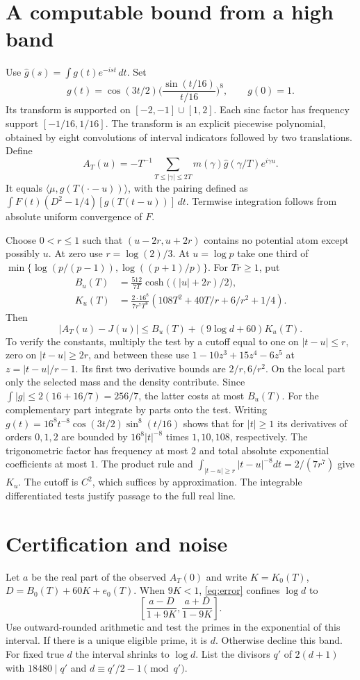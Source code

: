 \documentclass[11pt]{article}
\begin{document}
\section{A computable bound from a high band}
Use $\widehat g(s)=\int g(t)e^{-ist}\,dt$. Set
\[
 g(t)=\cos(3t/2)\bigg(\frac{\sin(t/16)}{t/16}\bigg)^8,\qquad g(0)=1.
\]
Its transform is supported on $[-2,-1]\cup[1,2]$. Each sinc factor
has frequency support $[-1/16,1/16]$. The transform is an explicit
piecewise polynomial, obtained by eight convolutions of interval
indicators followed by two translations. Define
\[
 A_T(u)=-T^{-1}\sum_{T\le|\gamma|\le2T}m(\gamma)
                \widehat g(\gamma/T)e^{i\gamma u}.
\]
It equals $\langle\mu,g(T(\cdot-u))\rangle$, with the pairing defined as
$\int F(t)(D^2-1/4)[g(T(t-u))]\,dt$.
Termwise integration follows from absolute uniform convergence of $F$.

Choose $0<r\le1$ such that $(u-2r,u+2r)$ contains no potential atom except
possibly $u$. At zero use $r=\log(2)/3$. At $u=\log p$ take one third
of $\min\{\log(p/(p-1)),\log((p+1)/p)\}$. For $Tr\ge1$, put
\begin{align*}
 B_u(T)&=\frac{512}{7T}\cosh\big((|u|+2r)/2\big),\\
 K_u(T)&=\frac{2\cdot16^8}{7r^7 T^8}
        \left(108T^2+40T/r+6/r^2+1/4\right).
\end{align*}
Then
\begin{equation}
 |A_T(u)-J(u)|\le B_u(T)+(9\log d+60)K_u(T).
 \label{eq:error}
\end{equation}
To verify the constants, multiply the test by a cutoff equal to one on
$|t-u|\le r$, zero on $|t-u|\ge2r$, and between these use
$1-10z^3+15z^4-6z^5$ at $z=|t-u|/r-1$.
Its first two derivative bounds are $2/r,6/r^2$. On the local part only
the selected mass and the density contribute. Since
$\int|g|\le2(16+16/7)=256/7$, the latter costs at most $B_u(T)$.
For the complementary part integrate by parts onto the test. Writing
$g(t)=16^8t^{-8}\cos(3t/2)\sin^8(t/16)$ shows that for $|t|\ge1$
its derivatives of orders $0,1,2$ are bounded by
$16^8|t|^{-8}$ times $1,10,108$, respectively. The trigonometric
factor has frequency at most $2$ and total absolute exponential coefficients
at most $1$. The product rule and
$\int_{|t-u|\ge r}|t-u|^{-8}dt=2/(7r^7)$ give $K_u$.
The cutoff is $C^2$, which suffices by approximation. The integrable
differentiated tests justify passage to the full real line.

\section{Certification and noise}
Let $a$ be the real part of the observed $A_T(0)$ and write $K=K_0(T)$,
$D=B_0(T)+60K+e_0(T)$. When $9K<1$, \eqref{eq:error} confines $\log d$ to
\[
 \left[\frac{a-D}{1+9K},\frac{a+D}{1-9K}\right].
\]
Use outward-rounded arithmetic and test the primes in the exponential of
this interval. If there is a unique eligible prime, it is $d$. Otherwise
decline this band. For fixed true $d$ the interval shrinks to $\log d$.
List the divisors $q'$ of $2(d+1)$ with $18480\mid q'$ and
$d\equiv q'/2-1\pmod {q'}$.
\end{document}

